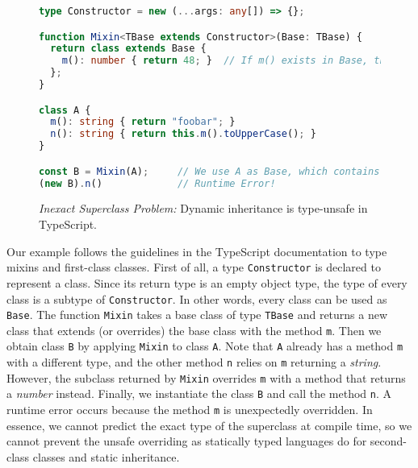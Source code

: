 \begin{figure}
\begin{lstlisting}[language=TypeScript]
type Constructor = new (...args: any[]) => {};

function Mixin<TBase extends Constructor>(Base: TBase) {
  return class extends Base {
    m(): number { return 48; }  // If m() exists in Base, that one will be overridden.
  };
}

class A {
  m(): string { return "foobar"; }
  n(): string { return this.m().toUpperCase(); }
}

const B = Mixin(A);     // We use A as Base, which contains m() with a different type.
(new B).n()             // Runtime Error!
\end{lstlisting}
\caption{\emph{Inexact Superclass Problem:} Dynamic inheritance is type-unsafe in TypeScript.} \label{fig:dynamic}
\end{figure}

Our example follows the guidelines in the TypeScript documentation to type
mixins and first-class classes. First of all, a type \lstinline{Constructor} is
declared to represent a class. Since its return type is an empty object type,
the type of every class is a subtype of \lstinline{Constructor}. In other words,
every class can be used as \lstinline{Base}. The function \lstinline{Mixin}
takes a base class of type \lstinline{TBase} and returns a new class that
extends (or overrides) the base class with the method \lstinline{m}. Then we
obtain class \lstinline{B} by applying \lstinline{Mixin} to class \lstinline{A}.
Note that \lstinline{A} already has a method \lstinline{m} with a different
type, and the other method \lstinline{n} relies on \lstinline{m} returning a
\emph{string}. However, the subclass returned by \lstinline{Mixin} overrides
\lstinline{m} with a method that returns a \emph{number} instead. Finally, we
instantiate the class \lstinline{B} and call the method \lstinline{n}. A runtime
error occurs because the method \lstinline{m} is unexpectedly overridden. In
essence, we cannot predict the exact type of the superclass at compile time, so
we cannot prevent the unsafe overriding as statically typed languages do for
second-class classes and static inheritance.

